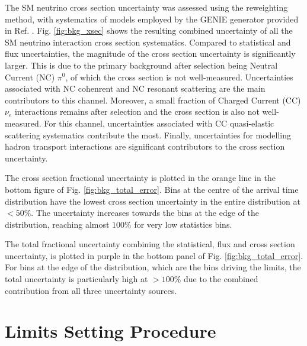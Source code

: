 The SM neutrino cross section uncertainty was assessed using the reweighting method, with systematics of models employed by the GENIE generator provided in Ref. \cite{genie_tune}.
Fig. \ref{fig:bkg_xsec} shows the resulting combined uncertainty of all the SM neutrino interaction cross section systematics.
Compared to statistical and flux uncertainties, the magnitude of the cross section uncertainty is significantly larger.
This is due to the primary background after selection being Neutral Current (NC) $\pi^0$, of which the cross section is not well-measured.  
Uncertainties associated with NC cohenrent and NC resonant scattering are the main contributors to this channel.
Moreover, a small fraction of Charged Current (CC) $\nu_e$ interactions remains after selection and the cross section is also not well-measured.
For this channel, uncertainties associated with CC quasi-elastic scattering systematics contribute the most.
Finally, uncertainties for modelling hadron transport interactions are significant contributors to the cross section uncertainty.

The cross section fractional uncertainty is plotted in the orange line in the bottom figure of Fig. \ref{fig:bkg_total_error}.
Bins at the centre of the arrival time distribution have the lowest cross section uncertainty in the entire distribution at $< 50\%$.
The uncertainty increases towards the bins at the edge of the distribution, reaching almost $100 \%$ for very low statistics bins.

The total fractional uncertainty combining the statistical, flux and cross section uncertainty, is plotted in purple in the bottom panel of Fig. \ref{fig:bkg_total_error}.
For bins at the edge of the distribution, which are the bins driving the limits, the total uncertainty is particularly high at $> 100\%$ due to the combined contribution from all three uncertainty sources.


\section{Limits Setting Procedure}
\label{sec:limit_procedure}

